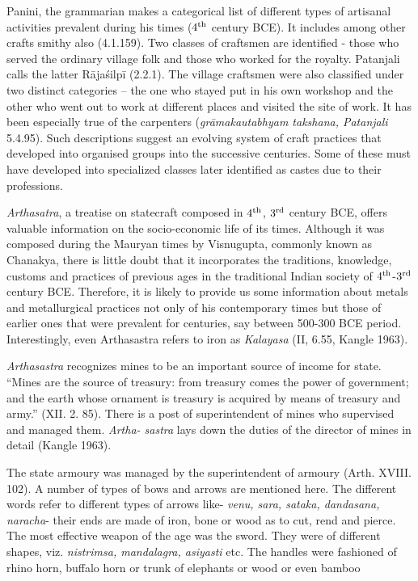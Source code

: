 Panini, the grammarian makes a categorical list of different types of artisanal activities prevalent during his times ($4^{\rm th}$ century BCE). It includes among other crafts smithy also (4.1.159). Two classes of craftsmen are identified - those who served the ordinary village folk and those who worked for the royalty. Patanjali calls the latter Rājaśilpī (2.2.1). The village craftsmen were also classified under two distinct categories – the one who stayed put in his own workshop and the other who went out to work at different places and visited the site of work. It has been especially true of the carpenters ({\it grāmakautabhyam takshana, Patanjali} 5.4.95). Such descriptions suggest an evolving system of craft practices that developed into organised groups into the successive centuries. Some of these must have developed into specialized classes later identified as castes due to their professions. 

{\it Arthasatra}, a treatise on statecraft composed in $4^{\rm th}$, $3^{\rm rd}$ century BCE, offers valuable information on the socio-economic life of its times. Although it was composed during the Mauryan times by Visnugupta, commonly known as Chanakya, there is little doubt that it incorporates the traditions, knowledge, customs and practices of previous ages in the traditional Indian society of $4^{\rm th}$-$3^{\rm rd}$ century BCE. Therefore, it is likely to provide us some information about metals and metallurgical practices not only of his contemporary times but those of earlier ones that were prevalent for centuries, say between 500-300 BCE period. Interestingly, even Arthasastra refers to iron as {\it Kalayasa} (II, 6.55, Kangle 1963).

{\it Arthasastra} recognizes mines to be an important source of income for state. “Mines are the source of treasury: from treasury comes the power of government; and the earth whose ornament is treasury is acquired by means of treasury and army.” (XII. 2. 85). There is a post of superintendent of mines who supervised and managed them. {\it Artha- sastra} lays down the duties of the director of mines in detail (Kangle 1963).

The state armoury was managed by the superintendent of armoury (Arth. XVIII. 102). A number of types of bows and arrows are mentioned here. The different words refer to different types of arrows like- {\it venu, sara, sataka, dandasana, naracha}- their ends are made of iron, bone or wood as to cut, rend and pierce. The most effective weapon of the age was the sword. They were of different shapes, viz. {\it nistrimsa, mandalagra, asiyasti} etc. The handles were fashioned of rhino horn, buffalo horn or trunk of elephants or wood or even bamboo

